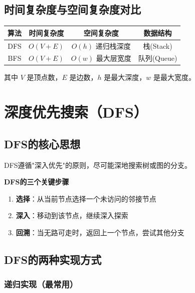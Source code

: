 \documentclass[12pt,a4paper]{article}
\begin{document}
	\subsection{时间复杂度与空间复杂度对比}
	
	\begin{center}
		\begin{tabular}{|c|c|c|c|}
			\hline
			\textbf{算法} & \textbf{时间复杂度} & \textbf{空间复杂度} & \textbf{数据结构} \\
			\hline
			DFS & $O(V + E)$ & $O(h)$ 递归栈深度 & 栈(Stack) \\
			\hline
			BFS & $O(V + E)$ & $O(w)$ 最大层宽度 & 队列(Queue) \\
			\hline
		\end{tabular}
	\end{center}
	
	其中 $V$ 是顶点数，$E$ 是边数，$h$ 是最大深度，$w$ 是最大宽度。
	
	\section{深度优先搜索（DFS）}
	
	\subsection{DFS的核心思想}
	
	DFS遵循"深入优先"的原则，尽可能深地搜索树或图的分支。
	
	\begin{greenbox}
		\textbf{DFS的三个关键步骤}
		
		\begin{enumerate}
			\item \textbf{选择}：从当前节点选择一个未访问的邻接节点
			\item \textbf{深入}：移动到该节点，继续深入探索
			\item \textbf{回溯}：当无路可走时，返回上一个节点，尝试其他分支
		\end{enumerate}
	\end{greenbox}
	
	\subsection{DFS的两种实现方式}
	
	\subsubsection{递归实现（最常用）}
	
\end{document}
